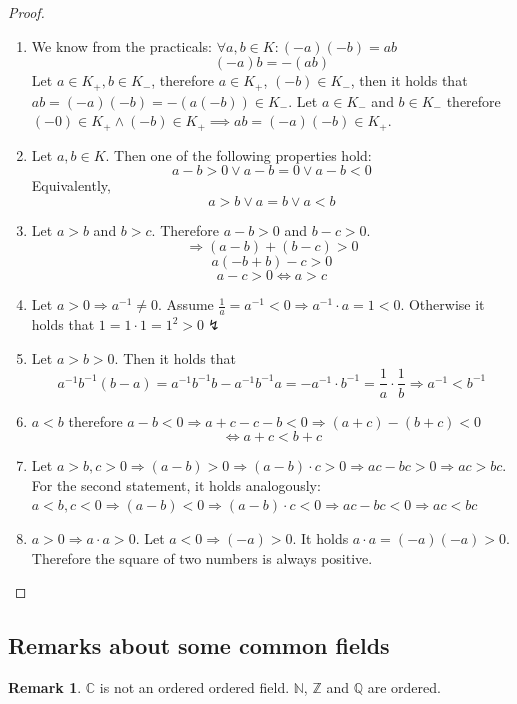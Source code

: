 \documentclass[a4paper,landscape,twocolumn]{article}
\theoremstyle{definition}
\newtheorem{rem}{Remark}
\begin{document}
\begin{proof}
  \begin{enumerate}
    \item We know from the practicals: $\forall a,b \in K: (-a)(-b) = ab$
      \[ (-a) b = -(ab) \]
      Let $a \in K_+, b \in K_-$, therefore $a \in K_+$, $(-b) \in K_-$,
      then it holds that $ab = (-a)(-b) = -(a(-b)) \in K_-$.
      Let $a \in K_-$ and $b \in K_-$ therefore $(-0) \in K_+ \land (-b) \in K_+
      \implies ab = (-a)(-b) \in K_+$.
    \item Let $a, b \in K$. Then one of the following properties hold:
      \[ a - b > 0 \lor a - b = 0 \lor a - b < 0 \]
      Equivalently,
      \[ a > b \lor a = b \lor a < b \]
    \item Let $a > b$ and $b > c$. Therefore $a - b > 0$ and $b - c > 0$.
      \[ \Rightarrow (a - b) + (b - c) > 0 \]
      \[ a(- b + b) - c > 0 \]
      \[ a - c > 0 \Leftrightarrow a > c \]
    \item Let $a > 0 \Rightarrow a^{-1} \neq 0$.
      Assume $\frac{1}{a} = a^{-1} < 0 \Rightarrow a^{-1} \cdot a = 1 < 0$.
      Otherwise it holds that $1 = 1 \cdot 1 = 1^2 > 0 \lightning$
    \item Let $a > b > 0$. Then it holds that
      \[
          a^{-1} b^{-1} (b - a)
          = a^{-1} b^{-1} b - a^{-1} b^{-1} a
          = -a^{-1} \cdot b^{-1}
          = \frac1a \cdot \frac1b
          \Rightarrow a^{-1} < b^{-1}
      \]
    \item $a < b$ therefore $a - b < 0 \Rightarrow a + c - c - b < 0 \Rightarrow (a + c) - (b + c) < 0$
      \[ \Leftrightarrow a + c < b + c \]
    \item Let $a > b, c > 0 \Rightarrow (a - b) > 0 \Rightarrow (a - b) \cdot c > 0 \Rightarrow ac - bc > 0
      \Rightarrow ac > bc$. For the second statement, it holds analogously:
      $a < b, c < 0 \Rightarrow (a - b) < 0 \Rightarrow (a - b) \cdot c < 0 \Rightarrow ac - bc < 0
        \Rightarrow ac < bc$
    \item $a > 0 \Rightarrow a \cdot a > 0$.
      Let $a < 0 \Rightarrow (-a) > 0$. It holds $a \cdot a = (-a)(-a) > 0$.
      Therefore the square of two numbers is always positive.
  \end{enumerate}
\end{proof}

\subsection{Remarks about some common fields}
\begin{rem}
  $\mathbb{C}$ is not an ordered ordered field.
  $\mathbb{N}$, $\mathbb{Z}$ and $\mathbb{Q}$ are ordered.
\end{rem}
\end{document}
